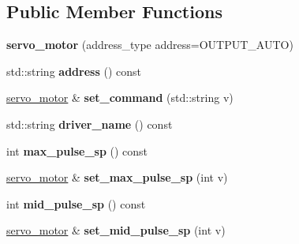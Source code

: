 \subsection*{Public Member Functions}
\begin{DoxyCompactItemize}
\item 
\mbox{\label{classev3dev_1_1servo__motor_ab5a6f5742a24a67dc3d60e2d74fd796f}} 
{\bfseries servo\+\_\+motor} (address\+\_\+type address=O\+U\+T\+P\+U\+T\+\_\+\+A\+U\+TO)
\item 
\mbox{\label{classev3dev_1_1servo__motor_a2cd867538d2677c008b38c97329d9770}} 
std\+::string {\bfseries address} () const
\item 
\mbox{\label{classev3dev_1_1servo__motor_a5af9a6b16b86e435d3d0b4f35938d0a3}} 
\hyperlink{classev3dev_1_1servo__motor}{servo\+\_\+motor} \& {\bfseries set\+\_\+command} (std\+::string v)
\item 
\mbox{\label{classev3dev_1_1servo__motor_ae106db8180e14844009ef5794a40dfec}} 
std\+::string {\bfseries driver\+\_\+name} () const
\item 
\mbox{\label{classev3dev_1_1servo__motor_aaf19927a86311c245d0f9be2a751fc0f}} 
int {\bfseries max\+\_\+pulse\+\_\+sp} () const
\item 
\mbox{\label{classev3dev_1_1servo__motor_a13dbdba344579064c743929777e7ee2c}} 
\hyperlink{classev3dev_1_1servo__motor}{servo\+\_\+motor} \& {\bfseries set\+\_\+max\+\_\+pulse\+\_\+sp} (int v)
\item 
\mbox{\label{classev3dev_1_1servo__motor_a6d5d8ca97e59eec482df66ef5b8bd61c}} 
int {\bfseries mid\+\_\+pulse\+\_\+sp} () const
\item 
\mbox{\label{classev3dev_1_1servo__motor_acc8d7539d71dfd469f9e590962b0d9ab}} 
\hyperlink{classev3dev_1_1servo__motor}{servo\+\_\+motor} \& {\bfseries set\+\_\+mid\+\_\+pulse\+\_\+sp} (int v)
\item 
\mbox{\label{classev3dev_1_1servo__motor_a6f4a768d900249763e2957b10a573f1b}} 

\end{DoxyCompactItemize}
